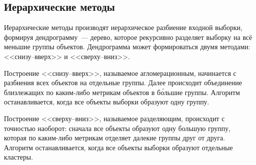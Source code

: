 \subsection{Иерархические методы}
Иерархические методы производят иерархическое разбиение входной выборки, формируя дендрограмму~--- дерево, которое рекурсивно разделяет выборку на всё меньшие группы объектов. Дендрограмма может формироваться двумя методами: <<снизу--вверх>> и <<сверху--вниз>>.

Построение <<снизу--вверх>>, называемое агломерационным, начинается с разбиения всех объектов на отдельные группы. Далее происходит объединение близлежащих по каким-либо метрикам объектов в б\'{о}льшие группы. Алгоритм останавливается, когда все объекты выборки образуют одну группу.

Построение <<сверху--вниз>>, называемое разделяющим, происходит с точностью наоборот: сначала все объекты образуют одну большую группу, которая по каким-либо метрикам отделяет далекие группы друг от друга. Алгоритм останавливается, когда все объекты выборки образуют отдельные кластеры.

